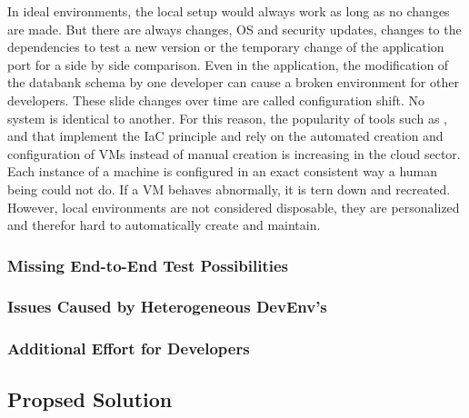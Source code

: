 \documentclass[12pt, a4paper]{article}
\begin{document}
        In ideal environments, the local setup would always work as long as no changes are made. But there are always changes, \ac{OS} and security updates, changes to the dependencies to test a new version or the temporary change of the application port for a side by side comparison. Even in the application, the modification of the databank schema by one developer can cause a broken environment for other developers. These slide changes over time are called configuration shift. No system is identical to another. For this reason, the popularity of tools such as ,  and  that implement the \ac{IaC} principle and rely on the automated creation and configuration of VMs instead of manual creation is increasing in the cloud sector. Each instance of a machine is configured in an exact consistent way a human being could not do. If a \ac{VM} behaves abnormally, it is tern down and recreated. However, local environments are not considered disposable, they are personalized and therefor hard to automatically create and maintain.
        \subsubsection{Missing End-to-End Test Possibilities}
        \subsubsection{Issues Caused by Heterogeneous \acs{DevEnv}'s} %
        \subsubsection{Additional Effort for Developers}

    \subsection{Propsed Solution}\newpage
\end{document}
